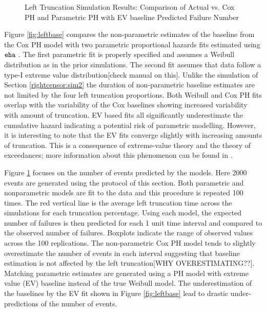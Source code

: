 \documentclass[12pt,letterpaper]{article}
\begin{document}
\begin{figure}[h!]
 	\caption{Left Truncation Simulation Results: Comparison of Actual vs. Cox PH and Parametric PH with EV baseline Predicted Failure Number}
 	\label{fig:lefttruncation}
 \end{figure}
Figure \ref{fig:leftbase} compares the non-parametric estimates of the baseline from the Cox PH model with two parametric proportional hazards fits estimated using $\tt eha$ \citep{eha}.  The first parametric fit is properly specified and assumes a  Weibull distribution as in the prior simulations.  The second fit assumes that data follow a type-I extreme value distribution[check manual on this]. Unlike the simulation of Section \ref{rightcensor:sim2} the duration of non-parametric baseline estimates are not limited by the four left truncation proportions.  Both Weibull and Cox PH fits overlap with the variability of the Cox baselines showing increased variability with amount of truncation.  EV based fits all significantly underestimate the cumulative hazard indicating a potential risk of parametric modelling.  However, it is interesting to note that the EV fits converge slightly with increasing amounts of truncation.  This is a consequence of extreme-value theory and the theory of exceedances; more information about this phenomenon can be found in \citet{coles2001}.

Figure \ref{fig:lefttruncation} focuses on the number of
events predicted by the models.  Here 2000 events are generated using the protocol of this section. Both parametric and nonparametric models are fit to the data and this procedure is repeated 100 times. The red vertical line is the average left truncation time across the simulations for each truncation percentage.  Using each model, the expected number of failures is then predicted for each 1 unit time interval and compared to the observed number of failures.  Boxplots indicate the range of observed values across the 100 replications. The non-parametric Cox PH model tends to slightly overestimate the number of events in each interval suggesting that baseline estimation is not affected by the left truncation[WHY OVERESTIMATING??].  Matching parametric estimates are generated using a PH model with extreme value (EV) baseline instead of the true Weibull model.  The underestimation of the baselines by the EV fit shown in Figure \ref{fig:leftbase} lead to drastic under-predictions of the number of events.


\end{document}
